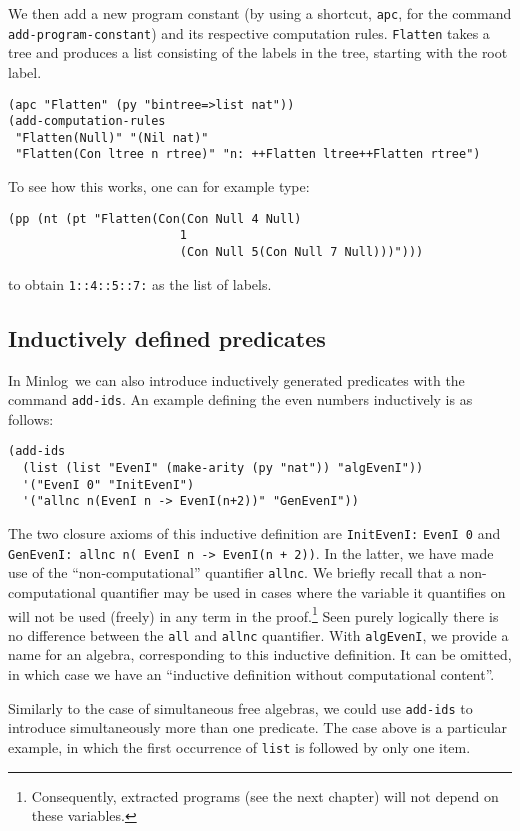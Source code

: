 \documentclass[12pt]{amsart}
\newcommand{\inquotes}[1]{``#1''}
\newcommand{\mi}{Minlog}
\begin{document}
We then add a new program constant (by using a shortcut, \texttt{apc},
for the command \texttt{add-program-constant}) and its respective
computation rules.  \texttt{Flatten} takes a tree and produces a list
consisting of the labels in the tree, starting with the root label.
\begin{verbatim}
(apc "Flatten" (py "bintree=>list nat"))
(add-computation-rules
 "Flatten(Null)" "(Nil nat)"
 "Flatten(Con ltree n rtree)" "n: ++Flatten ltree++Flatten rtree")
\end{verbatim}

To see how this works, one can for example type:
\begin{verbatim}
(pp (nt (pt "Flatten(Con(Con Null 4 Null)
                        1
                        (Con Null 5(Con Null 7 Null)))")))
\end{verbatim}
to obtain \texttt{1::4::5::7:} as the list of labels.


\subsection{Inductively defined predicates}
\label{EvenI}
In \mi\ we can also introduce inductively generated predicates with
the command \texttt{add-ids}.  An example defining the even numbers
inductively is as follows:
\begin{verbatim}
(add-ids
  (list (list "EvenI" (make-arity (py "nat")) "algEvenI"))
  '("EvenI 0" "InitEvenI")
  '("allnc n(EvenI n -> EvenI(n+2))" "GenEvenI"))
\end{verbatim}
The two closure axioms of this inductive definition are
\texttt{InitEvenI:} \texttt{EvenI 0} and \texttt{GenEvenI: allnc n(
  EvenI n -> EvenI(n + 2))}.  In the latter, we have made use of the
\inquotes{non-computational} quantifier \texttt{allnc}.  We briefly
recall that a non-computational quantifier may be used in cases where
the variable it quantifies on will not be used (freely) in any term in
the proof.\footnote{Consequently, extracted programs (see the next
  chapter) will not depend on these variables.}  Seen purely logically
there is no difference between the \texttt{all} and \texttt{allnc}
quantifier.  With \texttt{algEvenI}, we provide a name for an algebra,
corresponding to this inductive definition.  It can be omitted, in
which case we have an \inquotes{inductive definition without
  computational content}.

Similarly to the case of simultaneous free algebras, we could use
\texttt{add-ids} to introduce simultaneously more than one predicate.
The case above is a particular example, in which the first occurrence
of \texttt{list} is followed by only one item.
\end{document}
